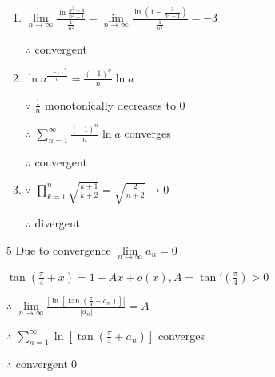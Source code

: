 \begin{enumerate}[1]
\begin{enumerate}[(1)]
                \item
                $\lim\limits_{n\rightarrow{\infty}}\frac{\ln \frac{n^2-4}{n^2-1}}{\frac{1}{n^2}}=\lim\limits_{n\rightarrow{\infty}}\frac{\ln \left(1-\frac{3}{n^2-1}\right)}{\frac{1}{n^2}}=-3$
                \par $\therefore$ convergent

                \item
                $\ln a^{\frac{(-1)^n}{n}}=\frac{(-1)^n}{n}\ln a$
                \par $\because$ $\frac{1}{n}$ monotonically decreases to 0
                \par $\therefore$ $\sum\limits_{n=1}^\infty \frac{(-1)^n}{n}\ln a$ converges
                \par $\therefore$ convergent

                \item
                $\because$ $\prod\limits_{k=1}^n \sqrt{\frac{k+1}{k+2}}=\sqrt{\frac{2}{n+2}}\rightarrow 0$
                \par $\therefore$ divergent
            \end{enumerate}

        \item[5]
        Due to convergence $\lim\limits_{n\rightarrow{\infty}}a_n=0$
        \par $\tan (\frac{\pi}{4}+x)=1+Ax+o(x), A=\tan '(\frac{\pi}{4})>0$
        \par $\therefore$ $\lim\limits_{n\rightarrow{\infty}}\frac{|\ln [\tan (\frac{\pi}{4}+a_n)]|}{|a_n|}=A$
        \par $\therefore$ $\sum\limits_{n=1}^\infty \ln [\tan (\frac{\pi}{4}+a_n)]$ converges
        \par $\therefore$ convergent\qed
    \end{enumerate}
